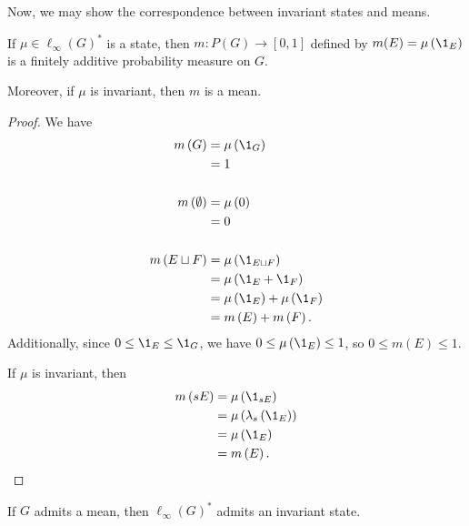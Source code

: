 Now, we may show the correspondence between invariant states and means.
\begin{proposition}\label{prop:state_implies_mean}
  If $\mu\in \ell_{\infty}\left(G\right)^{\ast}$ is a state, then $m\colon P(G)\rightarrow [0,1]$ defined by $m(E) = \mu\left(\1_{E}\right)$ is a finitely additive probability measure on $G$.\newline

  Moreover, if $\mu$ is invariant, then $m$ is a mean.
\end{proposition}
\begin{proof}
  We have
  \begin{align*}
    m\left(G\right) &= \mu\left(\1_{G}\right)\\
                    &= 1\\
                    \\
    m\left(\emptyset\right) &= \mu\left(0\right)\\
                            &= 0\\
                            \\
    m\left(E\sqcup F\right) &= \mu\left(\1_{E\sqcup F}\right)\\
                            &= \mu\left(\1_{E} + \1_{F}\right)\\
                            &= \mu\left(\1_{E}\right) + \mu\left(\1_{F}\right)\\
                            &= m\left(E\right) + m\left(F\right).
  \end{align*}
  Additionally, since $0 \leq \1_{E}\leq \1_{G}$, we have $0 \leq \mu\left(\1_{E}\right) \leq 1$, so $0 \leq m(E) \leq 1$.\newline

  If $\mu$ is invariant, then
  \begin{align*}
    m\left(sE\right) &= \mu\left(\1_{sE}\right)\\
                     &= \mu\left(\lambda_s\left(\1_{E}\right)\right)\\
                     &= \mu\left(\1_{E}\right)\\
                     &= m\left(E\right).
  \end{align*}
\end{proof}
\begin{proposition}\label{prop:mean_implies_state}
  If $G$ admits a mean, then $\ell_{\infty}\left(G\right)^{\ast}$ admits an invariant state.
\end{proposition}
